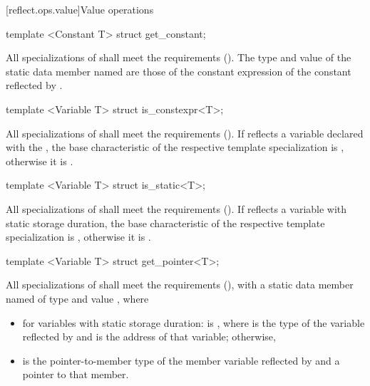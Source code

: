 [reflect.ops.value]{Value operations}

\begin{std.txt}\color{addclr}

\begin{itemdecl}
template <Constant T> struct get_constant;
\end{itemdecl}

\begin{itemdescr}
\pnum
All specializations of  shall meet the  requirements (). The type and value of the static data member named  are those of the constant expression of the constant reflected by .

\end{itemdescr}

\begin{itemdecl}
template <Variable T> struct is_constexpr<T>;
\end{itemdecl}

\begin{itemdescr}
\pnum
All specializations of  shall meet the  requirements (). If  reflects a variable declared with the  , the base characteristic of the respective template specialization is , otherwise it is .
\end{itemdescr}

\begin{itemdecl}
template <Variable T> struct is_static<T>;
\end{itemdecl}

\begin{itemdescr}
\pnum
All specializations of  shall meet the  requirements (). If  reflects a variable with static storage duration, the base characteristic of the respective template specialization is , otherwise it is .
\end{itemdescr}

\begin{itemdecl}
template <Variable T> struct get_pointer<T>;
\end{itemdecl}

\begin{itemdescr}
\pnum
All specializations of  shall meet the  requirements (), with a static data member named  of type  and value , where
\begin{itemize}
  \item for variables with static storage duration:  is , where  is the type of the variable reflected by  and  is the address of that variable; otherwise,
  \item {} is the pointer-to-member type of the member variable reflected by  and  a pointer to that member.
\end{itemize}
\end{itemdescr}
\end{std.txt}

